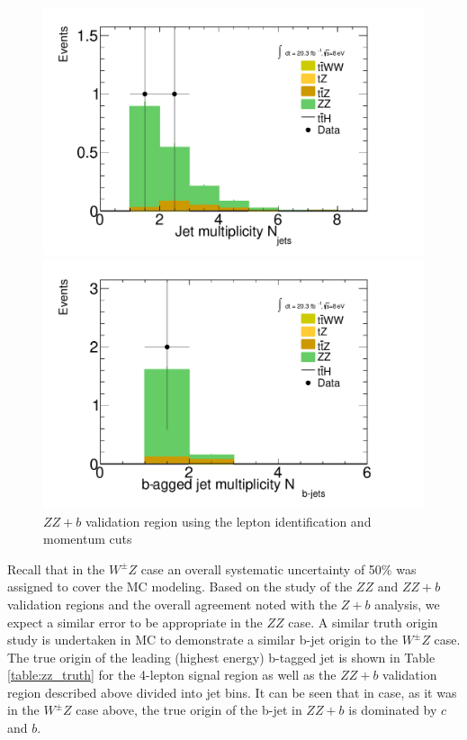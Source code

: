 \begin{figure}[htbp]
  \begin{minipage}[h]{0.5\textwidth}
    \centering \includegraphics[width=\textwidth]{figs/WZ/zz_b_NJet}
  \end{minipage}\hfill
  \begin{minipage}[h]{0.5\textwidth}
    \centering \includegraphics[width=\textwidth]{figs/WZ/zz_b_NJetBTag}
  \end{minipage}\hfill
        \caption{$ZZ+b$ validation region using the \tth lepton identification and momentum cuts }
        \label{figure:background_zz_z_b}
\end{figure}

 
Recall that in the $W^{\pm}Z$ case an overall systematic uncertainty of 50\% was assigned to cover the MC modeling. Based on the study of the $ZZ$ and 
$ZZ+b$ validation regions and the overall agreement noted with the $Z+b$ analysis, we expect a similar error to be appropriate in the $ZZ$ case.  
A similar truth origin study is undertaken in MC to demonstrate a similar b-jet origin to the $W^{\pm}Z$ case. The true origin of the leading (highest energy) b-tagged jet is shown in 
Table \ref{table:zz_truth} for the 4-lepton signal region as well as the $ZZ+b$ validation region described above divided into jet bins. It can be seen 
that in case, as it was in the $W^{\pm}Z$ case above, the true origin of the b-jet in $ZZ+b$ is dominated by $c$ and $b$.

